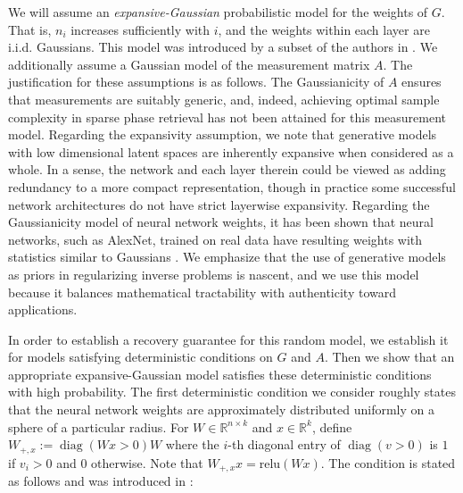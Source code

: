 \documentclass[11pt]{article}
\newcommand{\R}{\mathbb{R}}
\newcommand{\relu}{\text{relu}}
\newcommand{\diag}{\operatorname{diag}}
\newcommand{\G}{G}
\theoremstyle{remark}
\begin{document}
We will assume an \textit{expansive-Gaussian} probabilistic model for the weights of $\G$.  That is, $n_i$ increases sufficiently with $i$, and the weights within each layer are i.i.d. Gaussians.  This model was introduced by a subset of the authors in \cite{HV2017}.  We additionally assume a Gaussian model of the measurement matrix $A$.  The justification for these assumptions is as follows. The Gaussianicity of $A$ ensures that measurements are suitably generic, and, indeed, achieving optimal sample complexity in sparse phase retrieval has not been attained for this measurement model. Regarding the expansivity assumption, we note that generative models with low dimensional latent spaces are inherently expansive when considered as a whole.  In a sense, the network and each layer therein could be viewed as adding redundancy to a more compact representation, though in practice some successful network architectures do not have strict layerwise expansivity.  Regarding the Gaussianicity model of neural network weights, it has been shown  that neural networks, such as AlexNet, trained on real data have resulting weights with statistics similar to Gaussians \cite{GaussNets}. 
We emphasize that the use of generative models as priors in regularizing inverse problems is nascent, and we use this model  because it balances mathematical tractability with authenticity toward applications.  
   

In order to establish a recovery guarantee for this random model, we establish it for models satisfying deterministic conditions on $\G$ and $A$. Then we show that an appropriate expansive-Gaussian model satisfies these deterministic conditions with high probability.  The first deterministic condition we consider roughly states that the neural network weights are approximately distributed uniformly on a sphere of a particular radius.  For $W \in \R^{n \times k}$ and $x \in \R^k$, define $W_{+,x} := \diag(Wx > 0) W$ where the $i$-th diagonal entry of $\diag(v > 0)$ is $1$ if $v_i > 0$ and $0$ otherwise. Note that $W_{+,x}x = \relu(Wx)$. The condition is stated as follows and was introduced in \cite{HV2017}:
  
\end{document}
